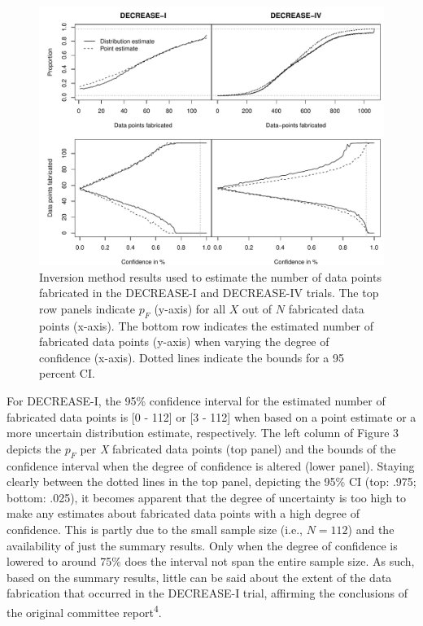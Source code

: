 \documentclass[]{article}
\begin{document}
\begin{figure}

{\centering \includegraphics[width=0.8\linewidth]{../figures/fig3} 

}

\caption{Inversion method results used to estimate the number of data points fabricated in the DECREASE-I and DECREASE-IV trials. The top row panels indicate $p_F$ (y-axis) for all $X$ out of $N$ fabricated data points (x-axis). The bottom row indicates the estimated number of fabricated data points (y-axis) when varying the degree of confidence (x-axis). Dotted lines indicate the bounds for a 95 percent CI.}\label{fig:figure 3}
\end{figure}

For DECREASE-I, the 95\% confidence interval for the estimated number of
fabricated data points is {[}0 - 112{]} or {[}3 - 112{]} when based on a
point estimate or a more uncertain distribution estimate, respectively.
The left column of Figure 3 depicts the \(p_F\) per \emph{X} fabricated
data points (top panel) and the bounds of the confidence interval when
the degree of confidence is altered (lower panel). Staying clearly
between the dotted lines in the top panel, depicting the 95\% CI (top:
.975; bottom: .025), it becomes apparent that the degree of uncertainty
is too high to make any estimates about fabricated data points with a
high degree of confidence. This is partly due to the small sample size
(i.e., \(N=112\)) and the availability of just the summary results. Only
when the degree of confidence is lowered to around 75\% does the
interval not span the entire sample size. As such, based on the summary
results, little can be said about the extent of the data fabrication
that occurred in the DECREASE-I trial, affirming the conclusions of the
original committee report\textsuperscript{4}.
\end{document}

